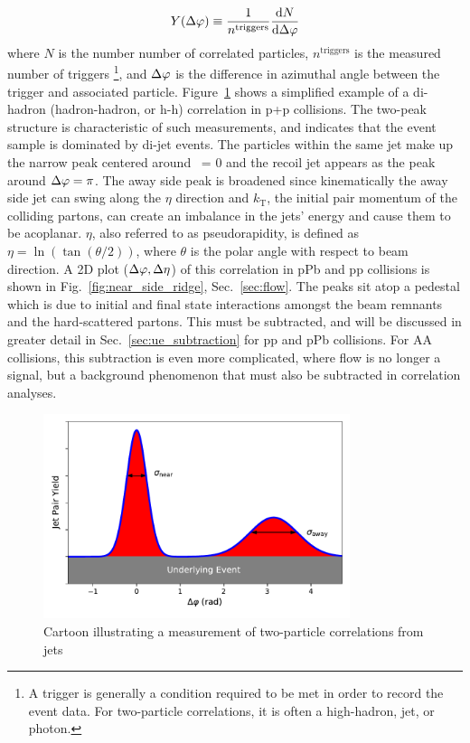 \begin{equation}
    Y(\Delta\varphi)\equiv \frac{1}{n^\mathrm{triggers}}\frac{\mathrm{d}N}{\mathrm{d}\Delta\varphi}
    \label{eq:yield}
  \end{equation}
where $N$ is the number number of correlated particles, $n^\mathrm{triggers}$ is the measured number of triggers \footnote{A trigger is generally a condition required to be met in order to record the event data. For two-particle correlations, it is often a high-\pt hadron, jet, or photon.}, and $\Delta\varphi$ is the difference in azimuthal angle between the trigger and associated particle. Figure~\ref{fig:dihadron_cartoon} shows a simplified example of a di-hadron (hadron-hadron, or h-h) correlation in p+p collisions. The two-peak structure is characteristic of such measurements, and indicates that the event sample is dominated by di-jet events. The particles within the same jet make up the narrow peak centered around \deltaphi~= 0 and the recoil jet appears as the peak around $\Delta\varphi = \pi$. The away side peak is broadened since kinematically the away side jet can swing along the $\eta$ direction and $k_\mathrm{T}$, the initial pair momentum of the colliding partons, can create an imbalance in the jets’ energy and cause them to be acoplanar. $\eta$, also referred to as pseudorapidity, is defined as $\eta = \ln(\tan(\theta/2))$, where $\theta$ is the polar angle with respect to beam direction. A 2D plot ($\Delta\varphi,\Delta\eta$) of this correlation in pPb and pp collisions is shown in Fig.~\ref{fig:near_side_ridge}, Sec.~\ref{sec:flow}. The peaks sit atop a pedestal which is due to initial and final state interactions amongst the beam remnants and the hard-scattered partons. This must be subtracted, and will be discussed in greater detail in Sec.~\ref{sec:ue_subtraction} for pp and pPb collisions. For AA collisions, this subtraction is even more complicated, where flow is no longer a signal, but a background phenomenon that must also be subtracted in correlation analyses. 

  \begin{figure}[htpb]
    \centering
    \includegraphics[width=0.8\textwidth]{Introduction/dihadron_cartoon.pdf}
    \caption{Cartoon illustrating a measurement of two-particle correlations from jets}
    \label{fig:dihadron_cartoon}
  \end{figure}

